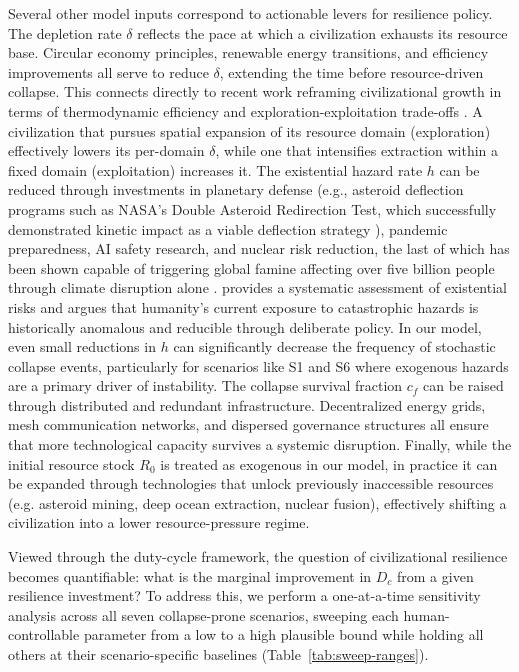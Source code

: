 Several other model inputs correspond to actionable levers for resilience policy. The depletion rate $\delta$ reflects the pace at which a civilization exhausts its resource base. Circular economy principles, renewable energy transitions, and efficiency improvements all serve to reduce $\delta$, extending the time before resource-driven collapse. This connects directly to recent work reframing civilizational growth in terms of thermodynamic efficiency and exploration-exploitation trade-offs \citep{Haqq-Misra2025-lum}. A civilization that pursues spatial expansion of its resource domain (exploration) effectively lowers its per-domain $\delta$, while one that intensifies extraction within a fixed domain (exploitation) increases it. The existential hazard rate $h$ can be reduced through investments in planetary defense (e.g., asteroid deflection programs such as NASA's Double Asteroid Redirection Test, which successfully demonstrated kinetic impact as a viable deflection strategy \citep{Daly2023-dart}), pandemic preparedness, AI safety research, and nuclear risk reduction, the last of which has been shown capable of triggering global famine affecting over five billion people through climate disruption alone \citep{Xia2022-nw}. \citet{Ord2020-tp} provides a systematic assessment of existential risks and argues that humanity's current exposure to catastrophic hazards is historically anomalous and reducible through deliberate policy. In our model, even small reductions in $h$ can significantly decrease the frequency of stochastic collapse events, particularly for scenarios like S1 and S6 where exogenous hazards are a primary driver of instability. The collapse survival fraction $c_f$ can be raised through distributed and redundant infrastructure. Decentralized energy grids, mesh communication networks, and dispersed governance structures all ensure that more technological capacity survives a systemic disruption. Finally, while the initial resource stock $R_0$ is treated as exogenous in our model, in practice it can be expanded through technologies that unlock previously inaccessible resources (e.g. asteroid mining, deep ocean extraction, nuclear fusion), effectively shifting a civilization into a lower resource-pressure regime.

Viewed through the duty-cycle framework, the question of civilizational resilience becomes quantifiable: what is the marginal improvement in $D_c$ from a given resilience investment? To address this, we perform a one-at-a-time sensitivity analysis across all seven collapse-prone scenarios, sweeping each human-controllable parameter from a low to a high plausible bound while holding all others at their scenario-specific baselines (Table~\ref{tab:sweep-ranges}).

